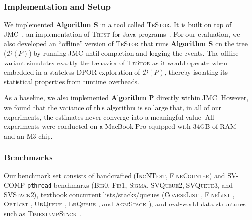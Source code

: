 \documentclass[acmsmall]{acmart}
\def\MZ#1{{\textcolor{blue}{\textbf{MZ:} #1}}}
\def\MO#1{{\textcolor{orange}{\textbf{MO:} #1}}}
\renewcommand{\MZ}[1]{}
\renewcommand{\MO}[1]{}
\newcommand{\trust}{\textsc{Trust}\xspace}
\newcommand{\testor}{\textsc{TeStor}\xspace}
\newcommand{\dpor}{\textsc{DPOR}\xspace}
\newcommand{\jmc}{\textsc{JMC}\xspace}
\newcommand{\fwdtikz}{%
  \tikz[baseline=(char.base)]{
    \node[shape=circle, draw, fill=lime!50, inner sep=0.15pt] (char) {$\looparrowright$};
  }
}
\newcommand{\bwdtikz}{%
  \tikz[baseline=(char.base)]{
    \node[shape=circle, draw, fill=red!30, inner sep=0.15pt] (char) {$\looparrowleft$};
  }
}
\begin{document}
\subsubsection*{Implementation and Setup}

We implemented \textbf{Algorithm S} in a tool called \testor. 
It is built on top of \jmc~\cite{jmc}, an implementation of \trust for Java programs~\cite{condpor}.
For our evaluation, we also developed an ``offline'' version of \testor that runs \textbf{Algorithm S} 
on the tree ($\mathcal{D}(P)$) by running \jmc until completion and logging the events.
%
The offline variant simulates exactly the behavior of \testor as it would operate when embedded in a stateless \dpor exploration of $\mathcal{D}(P)$, thereby isolating its statistical properties from runtime overheads.

As a baseline, we also implemented \textbf{Algorithm P} directly within \jmc.
However, we found that the variance of this algorithm is so large that, in all of our experiments, the estimates never converge into a meaningful value.
All experiments were conducted on a MacBook Pro equipped with 34GB of RAM and an M3 chip.

\subsubsection*{Benchmarks}
Our benchmark set consists of handcrafted (\textsc{IncNTest}, \textsc{FineCounter}) and SV-COMP-\texttt{pthread} \cite{svcomp} benchmarks (\textsc{Big0}, \textsc{Fib1}, \textsc{Sigma}, \textsc{SVQueue2}, \textsc{SVQueue3}, and \textsc{SVStack2}),
  textbook concurrent lists/stacks/queues (\textsc{CoarseList} \cite{book:herlihy-shavit}, \textsc{FineList} \cite{finelist}, \textsc{OptList} \cite{book:herlihy-shavit}, \textsc{UbQueue} \cite{book:herlihy-shavit}, 
  \textsc{LbQueue} \cite{book:herlihy-shavit}, and \textsc{AgmStack} \cite{agmstack}), and real-world data structures such as \textsc{TimestampStack} \cite{timestamped-stack}.
\end{document}

